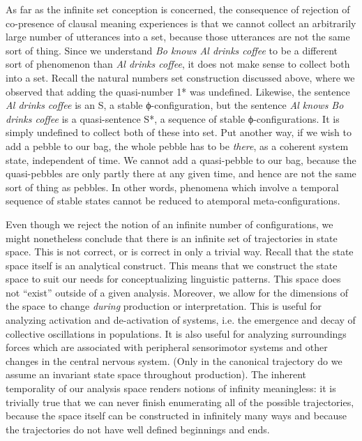   As far as the infinite set conception is concerned, the consequence of rejection of co-presence of clausal meaning experiences is that we cannot collect an arbitrarily large number of utterances into a set, because those utterances are not the same sort of thing. Since we understand \textit{Bo knows Al drinks coffee} to be a different sort of phenomenon than \textit{Al drinks coffee}, it does not make sense to collect both into a set. Recall the natural numbers set construction discussed above, where we observed that adding the quasi-number 1* was undefined. Likewise, the sentence \textit{Al drinks coffee} is an S, a stable ϕ-configuration, but the sentence \textit{Al knows Bo drinks coffee} is a quasi-sentence S*, a sequence of stable ϕ-configurations. It is simply undefined to collect both of these into set. Put another way, if we wish to add a pebble to our bag, the whole pebble has to be \textit{there}, as a coherent system state, independent of time. We cannot add a quasi-pebble to our bag, because the quasi-pebbles are only partly there at any given time, and hence are not the same sort of thing as pebbles. In other words, phenomena which involve a temporal sequence of stable states cannot be reduced to atemporal meta-configurations.

  Even though we reject the notion of an infinite number of configurations, we might nonetheless conclude that there is an infinite set of trajectories in state space. This is not correct, or is correct in only a trivial way. Recall that the state space itself is an analytical construct. This means that we construct the state space to suit our needs for conceptualizing linguistic patterns. This space does not “exist” outside of a given analysis. Moreover, we allow for the dimensions of the space to change \textit{during} production or interpretation. This is useful for analyzing activation and de-activation of systems, i.e. the emergence and decay of collective oscillations in populations. It is also useful for analyzing surroundings forces which are associated with peripheral sensorimotor systems and other changes in the central nervous system.  (Only in the canonical trajectory do we assume an invariant state space throughout production). The inherent temporality of our analysis space renders notions of infinity meaningless: it is trivially true that we can never finish enumerating all of the possible trajectories, because the space itself can be constructed in infinitely many ways and because the trajectories do not have well defined beginnings and ends.

